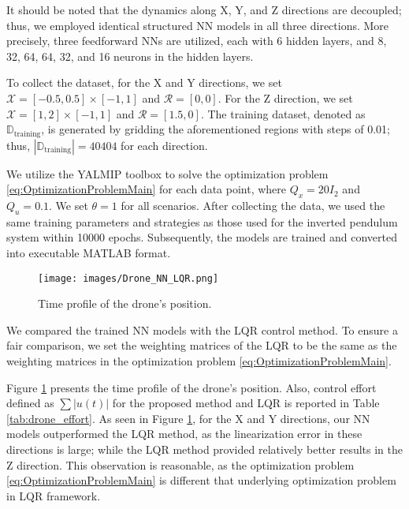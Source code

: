 \documentclass[1p,times]{elsarticle}
\begin{document}
{%


It should be noted that the dynamics along X, Y, and Z directions are decoupled; thus, we employed identical structured NN models in all three directions. More precisely, three feedforward NNs are utilized, each with 6 hidden
layers, and 8, 32, 64, 64, 32, and 16 neurons in the hidden layers. 

To collect the dataset, for the X and Y directions, we set $\mathcal{X}=[-0.5,0.5]\times[-1,1]$ and $\mathcal{R}=[0,0]$. For the Z direction, we set $\mathcal{X}=[1,2]\times[-1,1]$ and $\mathcal{R}=[1.5,0]$. The training dataset, denoted as $\mathbb{D}_{\text{training}}$, is generated by gridding the aforementioned regions with steps of 0.01; thus, $|\mathbb{D}_{\text{training}}|=40404$ for each direction.

We utilize the YALMIP toolbox to solve the optimization problem \eqref{eq:OptimizationProblemMain} for each data point, where $Q_x=20I_2$ and $Q_u=0.1$. We set $\theta=1$ for all scenarios. After collecting the data, we used the same training parameters and strategies as those used for the inverted pendulum system within 10000 epochs. Subsequently, the models are trained and converted into executable MATLAB format.

\begin{figure}[!t]
    \centering
    \texttt{[image: images/Drone\_NN\_LQR.png]}
    \caption{{{\color{blue}}Time profile of the drone's position.}}
    \label{fig:Drone_cpr}
\end{figure}


We compared the trained NN models with the LQR control method. To ensure a fair comparison, we set the weighting matrices of the LQR to be the same as the weighting matrices in the optimization problem \eqref{eq:OptimizationProblemMain}. 

Figure \ref{fig:Drone_cpr} presents the time profile of the drone's position. Also, control effort defined as $\sum\left\vert u(t)\right\vert$ for the proposed method and LQR is reported in Table \ref{tab:drone_effort}. As seen in Figure \ref{fig:Drone_cpr}, for the X and Y directions, our NN models outperformed the LQR method, as the linearization error in these directions is large; while the LQR method provided relatively better results in the Z direction. This observation is reasonable, as the optimization problem \eqref{eq:OptimizationProblemMain} is different that underlying optimization problem in LQR framework. 
}
\end{document}
